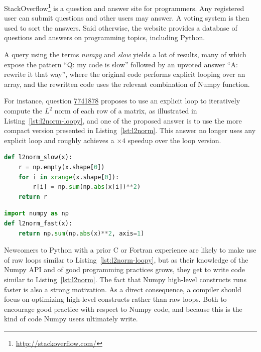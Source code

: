 \documentclass[10pt, preprint]{sigplanconf}
\begin{document}
StackOverflow\footnote{\url{http://stackoverflow.com/}} is a question and
answer site for programmers. Any registered user can submit questions and other
users may answer. A voting system is then used to sort the answers. Said
otherwise, the website provides a database of questions and answers on
programming topics, including Python.

A query using the terms \emph{numpy} and \emph{slow} yields a lot of results, many
of which expose the pattern ``Q: my code is slow'' followed by an upvoted answer
``A: rewrite it that way'', where the original code performs explicit looping
over an array, and the rewritten code uses the relevant combination of Numpy
function.

For instance, question \href{http://stackoverflow.com/questions/7741878}{7741878}
proposes to use an explicit loop to iteratively compute the $L^2$ norm of each
row of a matrix, as illustrated in Listing~\ref{lst:l2norm-loopy}, and one of
the proposed answer is to use the more compact version presented in
Listing~\ref{lst:l2norm}. This answer no longer uses any explicit loop and
roughly achieves a $\times 4$ speedup over the loop version.

\begin{lstlisting}[language=python,caption={Per row version of $L^2$ norm with loop in Numpy.}, label={lst:l2norm-loopy}]
def l2norm_slow(x):
    r = np.empty(x.shape[0])
    for i in xrange(x.shape[0]):
        r[i] = np.sum(np.abs(x[i])**2)
    return r
\end{lstlisting}

\begin{lstlisting}[language=python,caption={Per row version of $L^2$ norm without loop in Numpy.}, label={lst:l2norm}]
import numpy as np
def l2norm_fast(x):
    return np.sum(np.abs(x)**2, axis=1)
\end{lstlisting}

Newcomers to Python with a prior C or Fortran experience are likely to make
use of raw loops similar to Listing~\ref{lst:l2norm-loopy}, but as their
knowledge of the Numpy API and of good programming practices grows, they get to 
write code similar to Listing~\ref{lst:l2norm}. 
The fact that Numpy high-level constructs runs faster is also a strong 
motivation. As a direct consequence, a compiler should focus on optimizing
high-level constructs rather than raw
loops. Both to encourage good practice with respect to Numpy code, and because
this is the kind of code Numpy users ultimately write.
\end{document}
